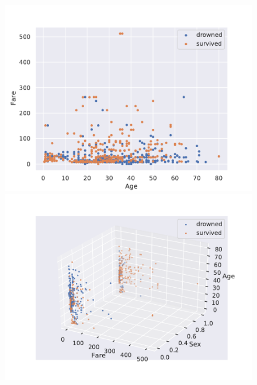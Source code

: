 \documentclass{book}
\begin{document}
\clearpage
\begin{figure}
    \centering
    \includegraphics[scale=.75]{../figs/scatter2d_Age_Fare.pdf}
    \includegraphics[scale=0.7]{../figs/scatter3d.pdf}%
\end{figure}



\clearpage
\end{document}
